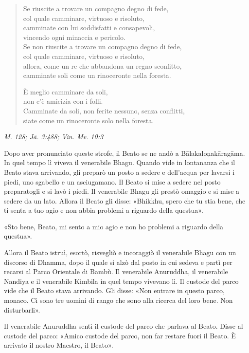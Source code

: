 \begin{quote}
Se riuscite a trovare un compagno degno di fede, \\
col quale camminare, virtuoso e risoluto, \\
camminate con lui soddisfatti e consapevoli, \\
vincendo ogni minaccia e pericolo. \\
Se non riuscite a trovare un compagno degno di fede, \\
col quale camminare, virtuoso e risoluto, \\
allora, come un re che abbandona un regno sconfitto, \\
camminate soli come un rinoceronte nella foresta.


È meglio camminare da soli, \\
non c’è amicizia con i folli. \\
Camminate da soli, non ferite nessuno, senza conflitti, \\
siate come un rinoceronte solo nella foresta.
\end{quote}

\emph{M. 128; Jā. 3:488; Vin. Mv. 10:3} \\


Dopo aver pronunciato queste strofe, il Beato se ne andò a
Bālakaloṇakāragāma. In quel tempo lì viveva il venerabile Bhagu. Quando
vide in lontananza che il Beato stava arrivando, gli preparò un posto a
sedere e dell’acqua per lavarsi i piedi, uno sgabello e un asciugamano.
Il Beato si mise a sedere nel posto preparatogli e si lavò i piedi. Il
venerabile Bhagu gli prestò omaggio e si mise a sedere da un lato.
Allora il Beato gli disse: «Bhikkhu, spero che tu stia bene, che ti
senta a tuo agio e non abbia problemi a riguardo della questua».


«Sto bene, Beato, mi sento a mio agio e non ho problemi a riguardo della
questua».


Allora il Beato istruì, esortò, risvegliò e incoraggiò il venerabile
Bhagu con un discorso di Dhamma, dopo il quale si alzò dal posto in cui
sedeva e partì per recarsi al Parco Orientale di Bambù. Il venerabile
Anuruddha, il venerabile Nandiya e il venerabile Kimbila in quel tempo
vivevano lì. Il custode del parco vide che il Beato stava arrivando. Gli
disse: «Non entrare in questo parco, monaco. Ci sono tre uomini di rango
che sono alla ricerca del loro bene. Non disturbarli».


Il venerabile Anuruddha sentì il custode del parco che parlava al Beato.
Disse al custode del parco: «Amico custode del parco, non far restare
fuori il Beato. È arrivato il nostro Maestro, il Beato».


